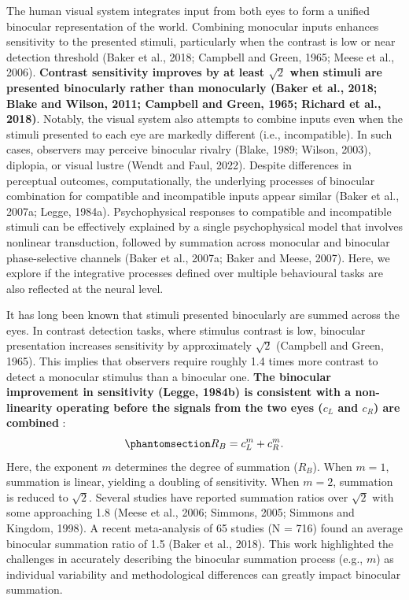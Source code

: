\documentclass[
  12pt,
]{article}
\begin{document}
The human visual system integrates input from both eyes to form a
unified binocular representation of the world. Combining monocular
inputs enhances sensitivity to the presented stimuli, particularly when
the contrast is low or near detection threshold (Baker et al., 2018;
Campbell and Green, 1965; Meese et al., 2006). \textbf{Contrast
sensitivity improves by at least \(\sqrt{2}\) when stimuli are presented
binocularly rather than monocularly (Baker et al., 2018; Blake and
Wilson, 2011; Campbell and Green, 1965; Richard et al., 2018)}. Notably,
the visual system also attempts to combine inputs even when the stimuli
presented to each eye are markedly different (i.e., incompatible). In
such cases, observers may perceive binocular rivalry (Blake, 1989;
Wilson, 2003), diplopia, or visual lustre (Wendt and Faul, 2022).
Despite differences in perceptual outcomes, computationally, the
underlying processes of binocular combination for compatible and
incompatible inputs appear similar (Baker et al., 2007a; Legge, 1984a).
Psychophysical responses to compatible and incompatible stimuli can be
effectively explained by a single psychophysical model that involves
nonlinear transduction, followed by summation across monocular and
binocular phase-selective channels (Baker et al., 2007a; Baker and
Meese, 2007). Here, we explore if the integrative processes defined over
multiple behavioural tasks are also reflected at the neural level.

It has long been known that stimuli presented binocularly are summed
across the eyes. In contrast detection tasks, where stimulus contrast is
low, binocular presentation increases sensitivity by approximately
\(\sqrt{2}\) (Campbell and Green, 1965). This implies that observers
require roughly 1.4 times more contrast to detect a monocular stimulus
than a binocular one. \textbf{The binocular improvement in sensitivity
(Legge, 1984b) is consistent with a non-linearity operating before the
signals from the two eyes (\(c_L\) and \(c_R\)) are combined} :
\begin{equation}\phantomsection\label{eq-IntroMath1}{
R_B = c_L^m + c_R^m.
}\end{equation} Here, the exponent \(m\) determines the degree of
summation (\(R_B\)). When \(m = 1\), summation is linear, yielding a
doubling of sensitivity. When \(m = 2\), summation is reduced to
\(\sqrt{2}\). Several studies have reported summation ratios over
\(\sqrt{2}\) with some approaching 1.8 (Meese et al., 2006; Simmons,
2005; Simmons and Kingdom, 1998). A recent meta-analysis of 65 studies
(N = 716) found an average binocular summation ratio of 1.5 (Baker et
al., 2018). This work highlighted the challenges in accurately
describing the binocular summation process (e.g., \(m\)) as individual
variability and methodological differences can greatly impact binocular
summation.
\end{document}
